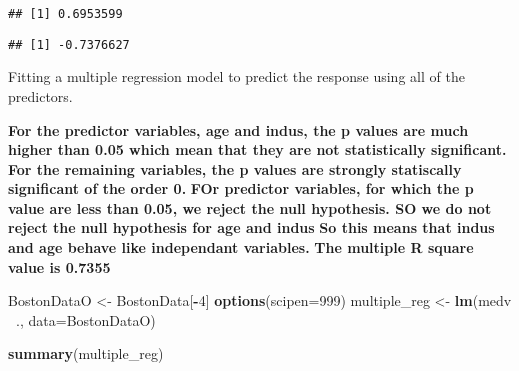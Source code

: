 \documentclass[]{article}
\newenvironment{Shaded}{\begin{snugshade}}{\end{snugshade}}
\newcommand{\CommentTok}[1]{\textcolor[rgb]{0.56,0.35,0.01}{\textit{#1}}}
\newcommand{\DataTypeTok}[1]{\textcolor[rgb]{0.13,0.29,0.53}{#1}}
\newcommand{\DecValTok}[1]{\textcolor[rgb]{0.00,0.00,0.81}{#1}}
\newcommand{\KeywordTok}[1]{\textcolor[rgb]{0.13,0.29,0.53}{\textbf{#1}}}
\newcommand{\NormalTok}[1]{#1}
\newcommand{\OperatorTok}[1]{\textcolor[rgb]{0.81,0.36,0.00}{\textbf{#1}}}
\newcommand{\StringTok}[1]{\textcolor[rgb]{0.31,0.60,0.02}{#1}}
\begin{document}
\begin{Shaded}
\end{Shaded}

\begin{verbatim}
## [1] 0.6953599
\end{verbatim}

\begin{Shaded}
\end{Shaded}

\begin{verbatim}
## [1] -0.7376627
\end{verbatim}

\item

Fitting a multiple regression model to predict the response using all of
the predictors.

\textbf{For the predictor variables, age and indus, the p values are
much higher than 0.05 which mean that they are not statistically
significant. For the remaining variables, the p values are strongly
statiscally significant of the order 0.} \textbf{FOr predictor
variables, for which the p value are less than 0.05, we reject the null
hypothesis. SO we do not reject the null hypothesis for age and indus}
\textbf{So this means that indus and age behave like independant
variables.} \textbf{The multiple R square value is 0.7355}

\begin{Shaded}
\begin{Highlighting}[]
\NormalTok{BostonDataO <-}\StringTok{ }\NormalTok{BostonData[}\OperatorTok{-}\DecValTok{4}\NormalTok{]}
\KeywordTok{options}\NormalTok{(}\DataTypeTok{scipen=}\DecValTok{999}\NormalTok{)}
\NormalTok{multiple_reg <-}\StringTok{ }\KeywordTok{lm}\NormalTok{(medv }\OperatorTok{~}\NormalTok{., }\DataTypeTok{data=}\NormalTok{BostonDataO)}

\KeywordTok{summary}\NormalTok{(multiple_reg)}
\end{Highlighting}
\end{Shaded}
\end{document}
